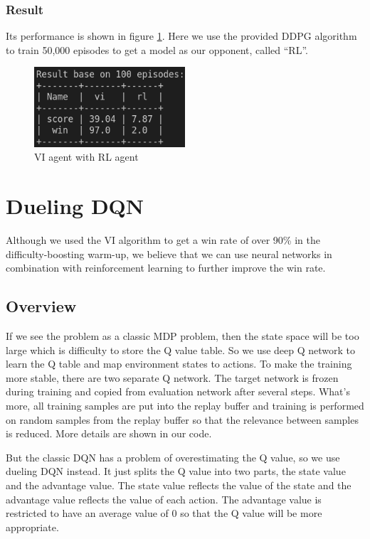 \documentclass{article}
\begin{document}
\subsubsection{Result}
Its performance is shown in figure \ref{vi-rl}. Here we use the provided DDPG algorithm to train 50,000 episodes to get a model as our opponent, called ``RL''.

\begin{figure}[h]
  \centering
  \includegraphics[width=0.5\textwidth]{figs/vi_vs_rl.png}
  \caption{VI agent with RL agent}
  \label{vi-rl}
\end{figure}

\section{Dueling DQN}

Although we used the VI algorithm to get a win rate of over 90\% in the difficulty-boosting warm-up, we believe that we can use neural networks in combination with reinforcement learning to further improve the win rate.

\subsection{Overview}
If we see the problem as a classic MDP problem, then the state space will be too large which is difficulty to store the Q value table. So we use deep Q network to learn the Q table and map environment states to actions. To make the training more stable, there are two separate Q network. The target network is frozen during training and copied from evaluation network after several steps. What's more, all training samples are put into the replay buffer and training is performed on random samples from the replay buffer so that the relevance between samples is reduced. More details are shown in our code.

But the classic DQN has a problem of overestimating the Q value, so we use dueling DQN instead. It just splits the Q value into two parts, the state value and the advantage value. The state value reflects the value of the state and the advantage value reflects the value of each action. The advantage value is restricted to have an average value of 0 so that the Q value will be more appropriate.
\end{document}
